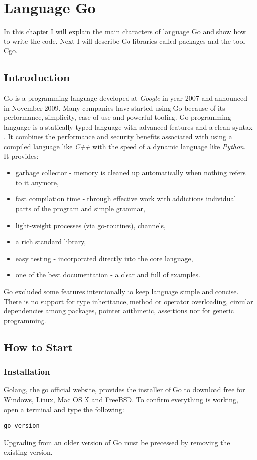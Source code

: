 \documentclass[
  digital, %
  notable,   %
  lof,     %
  lot,     %
]{fithesis3}
\begin{document}
\chapter{Language Go}\label{go}
In this chapter I will explain the main characters of language Go and show how to write the 
code. Next I will describe Go libraries called packages and the tool Cgo.

\section{Introduction}
Go is a programming language developed at \textit{Google} in year 2007 and announced in 
November 2009. Many companies have started using Go because of its performance, simplicity, 
ease of use and powerful tooling. Go programming language is a statically-typed language with 
advanced features and a clean syntax \cite{doxsey2016introducing}. It combines the performance 
and security benefits associated with using a compiled language like \textit{C++} with the 
speed of a dynamic language like \textit{Python}. It provides:
\vskip0.1in
\begin{itemize}[leftmargin=2em,rightmargin=1em,itemsep=0.75\parskip,parsep=0em,topsep=0em,partopsep=0em]
\item garbage collector - memory is cleaned up automatically when nothing refers to it 
anymore,
\item fast compilation time - through effective work with addictions individual parts of the 
program and simple grammar,
\item light-weight processes (via go-routines), channels,
\item a rich standard library,
\item easy testing - incorporated directly into the core language,
\item one of the best documentation - a clear and full of examples.
\end{itemize}
\vskip0.1in

Go excluded some features intentionally to keep language simple and concise. There is no 
support for type inheritance, method or operator overloading, circular dependencies among 
packages, pointer arithmetic, assertions nor for generic programming.
\nocite{wiki-go}
\nocite{doxsey2016introducing}

\section{How to Start}\label{howToStart}
\subsection{Installation}
Golang, the go official website, provides the installer of Go to download free for Windows, 
Linux, Mac OS X and FreeBSD. To confirm everything is working, open a terminal and 
type the following:
\begin{lstlisting}
go version
\end{lstlisting}
Upgrading from an older version of Go must be precessed by removing the existing version. 
\end{document}
